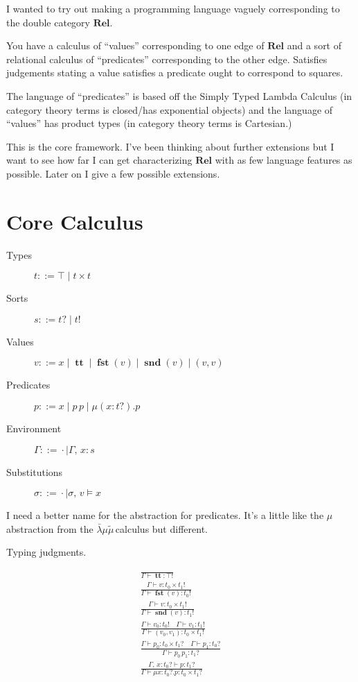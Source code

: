 \documentclass[twocolumn, fleqn]{scrartcl}
\newcommand{\Rel}{\textbf{Rel}}
\newcommand{\lk}{\(\bar{\lambda}\mu\tilde{\mu}\,\)}
\newcommand{\bnfdef}{\mathbin{::=}}
\DeclareMathOperator{\coin}{\textbf{tt}}
\DeclareMathOperator{\fst}{\textbf{fst}}
\DeclareMathOperator{\snd}{\textbf{snd}}
\begin{document}
I wanted to try out making a programming language vaguely
corresponding to the double category \(\Rel\).

You have a calculus of ``values'' corresponding to one edge of
\(\Rel\) and a sort of relational calculus of ``predicates''
corresponding to the other edge. Satisfies judgements stating a value
satisfies a predicate ought to correspond to squares.

The language of ``predicates'' is based off the Simply Typed Lambda
Calculus (in category theory terms is closed/has exponential objects)
and the language of ``values'' has product types (in category theory
terms is Cartesian.)

This is the core framework.  I've been thinking about further
extensions but I want to see how far I can get characterizing
\(\Rel\) with as few language features as possible.  Later on I
give a few possible extensions.

\section*{Core Calculus}

\begin{description}
\item[Types] \( t \bnfdef \top \mid t \times t \)
\item[Sorts] \( s \bnfdef t ? \mid t ! \)
\item[Values] \( v \bnfdef x \mid \coin \mid \fst(v) \mid \snd(v) \mid ( v , v )  \)
\item[Predicates] \( p \bnfdef x \mid p \, p \mid \mu (x \colon t ?) . p \)
\item[Environment] \( \Gamma \bnfdef \cdot \mid \Gamma , \, x \colon s  \)
\item[Substitutions] \( \sigma \bnfdef \cdot \mid \sigma , \, v \models x  \)
\end{description}

I need a better name for the abstraction for predicates. It's a little
like the \(\mu\) abstraction from the \lk calculus but
different.

Typing judgments.

\begin{multline*}
  \frac{
  }{
    \Gamma \vdash \coin \colon \top !
  }\\
  \frac{
    \Gamma \vdash v \colon t_0 \times t_1 !
  }{
    \Gamma \vdash \fst(v) \colon t_0 !
  }\\
  \frac{
    \Gamma \vdash v \colon t_0 \times t_1 !
  }{
    \Gamma \vdash \snd(v) \colon t_1 !
  }\\
  \frac{
    \Gamma \vdash v_0 \colon t_0 ! \quad
    \Gamma \vdash v_1 \colon t_1 !
  }{
    \Gamma \vdash ( v_0 , v_1 ) \colon t_0 \times t_1 !
  }\\
  \frac{
    \Gamma \vdash p_0 \colon t_0 \times t_1 ? \quad
    \Gamma \vdash p_1 \colon t_0 ?
  }{
    \Gamma \vdash p_0 \, p_1 \colon t_1 ?
  }\\
  \frac{
    \Gamma , \, x \colon t_0 ? \vdash p \colon t_1 ?
  }{
    \Gamma \vdash \mu x \colon t_0 ? . p \colon t_0 \times t_1 ?
  }\\
\end{multline*}
\end{document}
